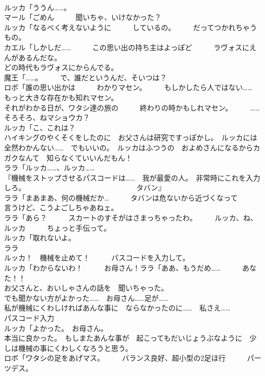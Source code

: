 \documentclass[8pt]{extreport}
\begin{document}
\begin{CJK}{UTF8}{min}
\\	ルッカ「ううん……。	
\\	マール「ごめん　　　聞いちゃ、いけなかった？	
\\	ルッカ「なるべく考えないように　　　しているの。　　　だってつかれちゃうもの。	
\\	カエル「しかしだ……　　　この思い出の持ち主はよっぽど　　　ラヴォスにえんがあるんだな。	
\\	どの時代もラヴォスにからんでる。	
\\	魔王「……。　　　で、誰だというんだ、そいつは？	
\\	ロボ「誰の思い出かは　　　わかりマセン。　　　もしかしたら人ではない……　　　もっと大きな存在かも知れマセン。	
\\	それがわかる日が、ワタシ達の旅の　　　終わりの時かもしれマセン。　　　……そろそろ、ねマショウカ？	
\\	ルッカ「こ、これは？	
\\	ハイキングのやくそくをしたのに　お父さんは研究ですっぽかし。　ルッカには全然わかんない……　でもいいの。　ルッカはふつうの　およめさんになるからカガクなんて　知らなくていいんだもん！	
\\	ララ「ルッカ……、ルッカ……	
\\	『機械をストップさせるパスコードは……　我が最愛の人。　非常時にこれを入力しろ。　　　　　　　　　　　　　　　　タバン』	
\\	ララ「まあまあ、何の機械だか…　　　タバンは危ないから近づくなって　　　言うけど、こうよごしちゃあねェ。	
\\	ララ「あら？　　　スカートのすそがはさまっちゃったわ。　　　ルッカ、ね、ルッカ　　　ちょっと手伝って。	
\\	ルッカ「取れないよ。	
\\	ララ
\\	ルッカ！　機械を止めて！　　　パスコードを入力して。	
\\	ルッカ「わからないわ！　　　お母さん！ララ「ああ、もうだめ……　　　あなた！！	
\\	お父さんと、おいしゃさんの話を　聞いちゃった。	
\\	でも聞かない方がよかった……　お母さん……足が……	
\\	私が機械にくわしければあんな事に　ならなかったのに……　私さえ……	
\\	パスコード入力	
\\	ルッカ「よかった。　お母さん。	
\\	本当に良かった。　もしまたあんな事が　起こってもだいじょうぶなように　少しは機械の事にくわしくなろうと思う。	
\\	ロボ「ワタシの足をあげマス。　　　バランス良好、超小型の2足ほ行　　　パーツデス。	

\end{CJK}
\end{document}
